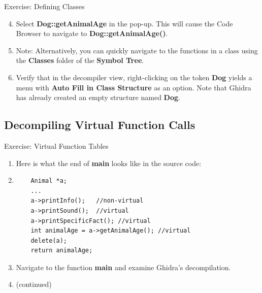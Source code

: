 \documentclass{beamer}
\begin{document}
\begin{frame}
\begin{block}{Exercise: Defining Classes}
\begin{enumerate}
\setcounter{enumi}{3}
\item Select \textbf{Dog::getAnimalAge} in the pop-up. This will cause the Code Browser to navigate to \textbf{Dog::getAnimalAge()}.
\item[] Note: Alternatively, you can quickly navigate to the functions in a class using the \textbf{Classes} folder of the \textbf{Symbol Tree}.
\item Verify that in the decompiler view, right-clicking on the token \textbf{Dog} yields a menu with \textbf{Auto Fill in Class Structure} as an option.  
Note that Ghidra has already created an empty structure named \textbf{Dog}.
\end{enumerate}
\end{block}
\end{frame}

\subsection{Decompiling Virtual Function Calls}

\begin{frame}[fragile]
\begin{block}{Exercise: Virtual Function Tables}
\begin{enumerate}
\item  Here is what the end of \textbf{main} looks like in the source code:
\label{snippet}
\item[]
\begin{verbatim}
    Animal *a;
    ...
    a->printInfo();   //non-virtual
    a->printSound();  //virtual
    a->printSpecificFact(); //virtual
    int animalAge = a->getAnimalAge(); //virtual
    delete(a);
    return animalAge;
\end{verbatim}
\item[] Navigate to the function \textbf{main} and examine Ghidra's decompilation.
\item[] (continued)
\end{enumerate}
\end{block}
\end{frame}
\end{document}
